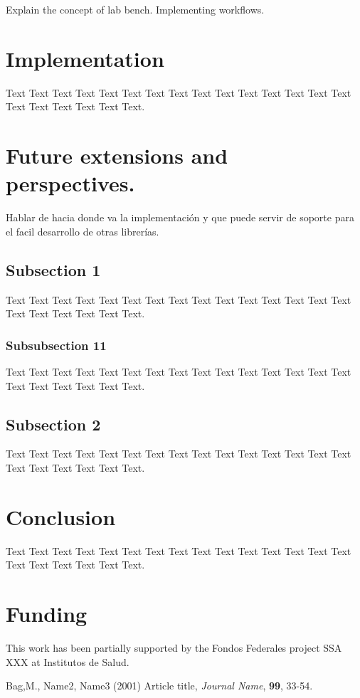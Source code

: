\documentclass{bioinfo}
\begin{document}
Explain the concept of lab bench.
Implementing workflows.

\section{Implementation}

Text Text Text Text Text Text Text Text
Text Text Text Text Text Text Text Text Text Text Text Text Text.

\section{Future extensions and perspectives.}

Hablar de hacia donde va la implementación y que puede servir de soporte para el facil desarrollo
de otras librerías.

\subsection{Subsection 1}

Text Text Text Text Text Text  Text Text Text Text Text Text Text
Text Text  Text Text Text Text Text Text.

\subsubsection{Subsubsection 11}

Text Text Text Text Text Text  Text Text Text Text Text Text Text
Text Text  Text Text Text Text Text Text.

\subsection{Subsection 2}

Text Text Text Text Text Text  Text Text Text Text Text Text Text
Text Text  Text Text Text Text Text Text.

\section{Conclusion}

Text Text Text Text Text Text  Text Text Text
Text Text Text Text Text Text  Text Text Text Text Text Text.

\section*{Funding}

This work has been partially supported by the Fondos Federales project SSA XXX at Institutos de
Salud.\vspace*{-12pt}

%
%
%
%
%
%
%
%
%

\begin{thebibliography}{}

Bag,M., Name2, Name3 (2001) Article title, {\it Journal Name}, {\bf 99}, 33-54.

\end{thebibliography}
\end{document}
